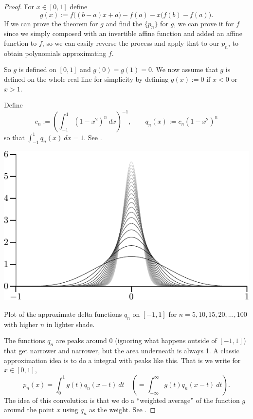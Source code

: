 \begin{proof}
For $x \in [0,1]$ define
\begin{equation*}
g(x) := f\bigl((b-a)x+a\bigr)-f(a) - x\bigl(f(b)-f(a)\bigr) .
\end{equation*}
If we can prove the theorem for $g$ and find the $\{ p_n \}$ for $g$,
we can prove it for $f$ since we simply
composed with an invertible affine function and added an affine
function to $f$, so we can easily reverse the process and apply that to our
$p_n$, to obtain polynomials approximating $f$.

So $g$ is defined on $[0,1]$ and $g(0)=g(1)=0$.  We now assume that
$g$ is defined on the whole real line for simplicity by defining
$g(x) := 0$ if $x < 0$ or $x > 1$.

Define
\begin{equation*}
c_n := {\left( \int_{-1}^1 {(1-x^2)}^n~dx \right)}^{-1} ,
\qquad
q_n(x) := c_n (1-x^2)^n
\end{equation*}
so that $\int_{-1}^1 q_n(x)~dx = 1$.
See .

\begin{myfigureht}
\includegraphics{figures/weierqn}
\caption{Plot of the approximate delta functions $q_n$ on $[-1,1]$ for
$n=5,10,15,20,\ldots,100$ with higher $n$ in lighter shade.\label{fig:weierqn}}
\end{myfigureht}

The functions $q_n$ are peaks around 0 (ignoring what happens outside
of $[-1,1]$) that get narrower and narrower, but the area underneath is
always 1.
A classic approximation idea
is to do a \emph{} integral with peaks like this.
That is we 
write for $x \in [0,1]$,
\begin{equation*}
p_n(x) = \int_{0}^1 g(t)q_n(x-t) ~dt \quad \left( = \int_{-\infty}^\infty
g(t)q_n(x-t) ~dt \right) .
\end{equation*}
The idea of this convolution is that we do a ``weighted average'' of the
function $g$ around the point $x$ using $q_n$ as the weight.
See .


\end{proof}
